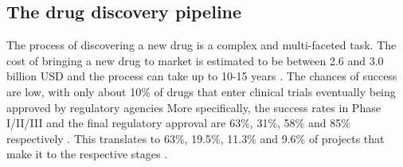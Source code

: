 \subsection{The drug discovery pipeline}
The process of discovering a new drug is a complex and multi-faceted task. The
cost of bringing a new drug to market is estimated to be between 2.6 and 3.0
billion USD \citep{todo} and the process can take up to 10-15 years
\citep{todo}. The chances of success are low, with only about 10\% of drugs that
enter clinical trials eventually being approved by regulatory agencies
More specifically, the success rates
in Phase I/II/III and the final regulatory approval are 63\%, 31\%, 58\% and
85\% respectively \citep{mullardParsingClinicalSuccess2016}. This translates to
63\%, 19.5\%, 11.3\% and 9.6\% of projects that make it to the respective stages
\citep{mullardParsingClinicalSuccess2016}.

